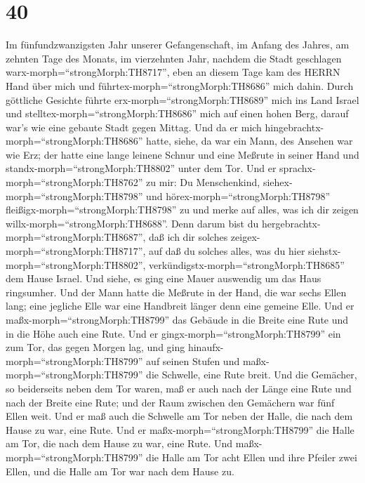 \hypertarget{section-39}{%
\section{40}\label{section-39}}

 Im fünfundzwanzigsten Jahr unserer Gefangenschaft, im
Anfang des Jahres, am zehnten Tage des Monats, im vierzehnten Jahr,
nachdem die Stadt geschlagen warx-morph=``strongMorph:TH8717'', eben an
diesem Tage kam des HERRN Hand über mich und
führtex-morph=``strongMorph:TH8686'' mich dahin.  Durch
göttliche Gesichte führte erx-morph=``strongMorph:TH8689'' mich ins Land
Israel und stelltex-morph=``strongMorph:TH8686'' mich auf einen hohen
Berg, darauf war's wie eine gebaute Stadt gegen Mittag.  Und
da er mich hingebrachtx-morph=``strongMorph:TH8686'' hatte, siehe, da
war ein Mann, des Ansehen war wie Erz; der hatte eine lange leinene
Schnur und eine Meßrute in seiner Hand und
standx-morph=``strongMorph:TH8802'' unter dem Tor.  Und er
sprachx-morph=``strongMorph:TH8762'' zu mir: Du Menschenkind,
siehex-morph=``strongMorph:TH8798'' und
hörex-morph=``strongMorph:TH8798'' fleißigx-morph=``strongMorph:TH8798''
zu und merke auf alles, was ich dir zeigen
willx-morph=``strongMorph:TH8688''. Denn darum bist du
hergebrachtx-morph=``strongMorph:TH8687'', daß ich dir solches
zeigex-morph=``strongMorph:TH8717'', auf daß du solches alles, was du
hier siehstx-morph=``strongMorph:TH8802'',
verkündigstx-morph=``strongMorph:TH8685'' dem Hause Israel. 
Und siehe, es ging eine Mauer auswendig um das Haus ringsumher. Und der
Mann hatte die Meßrute in der Hand, die war sechs Ellen lang; eine
jegliche Elle war eine Handbreit länger denn eine gemeine Elle. Und er
maßx-morph=``strongMorph:TH8799'' das Gebäude in die Breite eine Rute
und in die Höhe auch eine Rute.  Und er
gingx-morph=``strongMorph:TH8799'' ein zum Tor, das gegen Morgen lag,
und ging hinaufx-morph=``strongMorph:TH8799'' auf seinen Stufen und
maßx-morph=``strongMorph:TH8799'' die Schwelle, eine Rute breit.
 Und die Gemächer, so beiderseits neben dem Tor waren, maß
er auch nach der Länge eine Rute und nach der Breite eine Rute; und der
Raum zwischen den Gemächern war fünf Ellen weit. Und er maß auch die
Schwelle am Tor neben der Halle, die nach dem Hause zu war, eine Rute.
 Und er maßx-morph=``strongMorph:TH8799'' die Halle am Tor,
die nach dem Hause zu war, eine Rute.  Und
maßx-morph=``strongMorph:TH8799'' die Halle am Tor acht Ellen und ihre
Pfeiler zwei Ellen, und die Halle am Tor war nach dem Hause zu.
